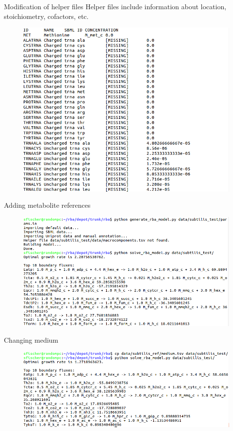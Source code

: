 \documentclass{beamer}
\begin{document}
\begin{frame}{Modification of helper files}
  Helper files include information about location, stoichiometry,
  cofactors, etc.
  \begin{figure}
    \centering
    \includegraphics[width=0.8\linewidth]{helper_file_metabolites}
  \end{figure}
\end{frame}

\begin{frame}{Adding metabolite references}
  \begin{figure}
    \centering
    \includegraphics[width=\linewidth]{added_metabolites}
  \end{figure}
\end{frame}

\begin{frame}{Changing medium}
  \begin{figure}
    \centering
    \includegraphics[width=\linewidth]{added_medium}
  \end{figure}
\end{frame}
\end{document}
